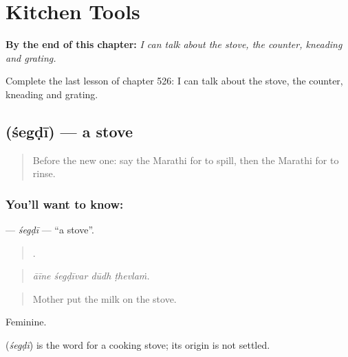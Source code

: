 
\chapter{Kitchen Tools}
\label{ch:mr-kitchen-tools}

\begin{chapteropening}
\textbf{By the end of this chapter:} \emph{I can talk about the stove, the counter, kneading and grating.}

Complete the last lesson of chapter 526: I can talk about the stove, the counter, kneading and grating.
\end{chapteropening}

\section[\texorpdfstring{\mr{शेगडी} (śegḍī)}{शेगडी (śegḍī)}]{ (śegḍī) — a stove}

\label{lesson:MR-C526-segdi}



\begin{quote}
Before the new one: say the Marathi for to spill, then the Marathi for to rinse.
\end{quote}

\subsection*{You'll want to know: }
\textbf{} — \emph{śegḍī} — \textquotedblleft{}a stove\textquotedblright{}.

\begin{quote}
   .
\end{quote}

\begin{quote}
\emph{āīne śegḍīvar dūdh ṭhevlaṁ.}
\end{quote}

\begin{quote}
Mother put the milk on the stove.
\end{quote}

Feminine.

\begin{cousinweb}
\textbf{} (\emph{śegḍī}) is the word for a cooking stove; its origin is not settled.
\end{cousinweb}

